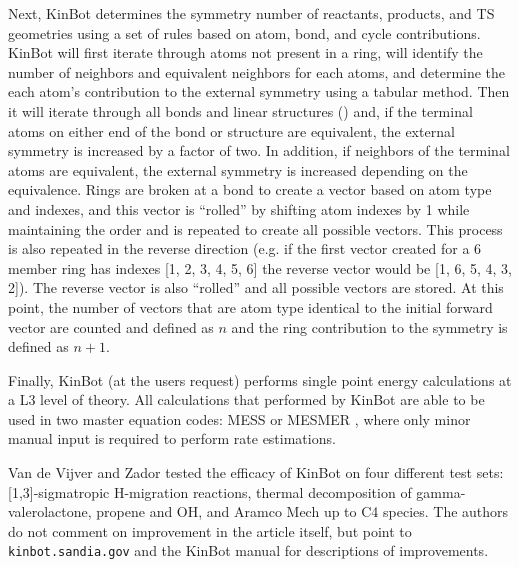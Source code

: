 \documentclass[preprint, 11pt]{elsarticle} %
\begin{document}
Next, KinBot determines the symmetry number of reactants, products, and TS geometries using a set of rules based on atom, bond, and cycle contributions.
KinBot will first iterate through atoms not present in a ring, will identify the number of neighbors and equivalent neighbors for each atoms, and determine the each atom's contribution to the external symmetry using a tabular method.
Then it will iterate through all bonds and linear structures () and, if the terminal atoms on either end of the bond or structure are equivalent, the external symmetry is increased by a factor of two.
In addition, if neighbors of the terminal atoms are equivalent, the external symmetry is increased depending on the equivalence.
Rings are broken at a bond to create a vector based on atom type and indexes, and this vector is ``rolled'' by shifting atom indexes by 1 while maintaining the order and is repeated to create all possible vectors.
This process is also repeated in the reverse direction (e.g. if the first vector created for a 6 member ring has indexes [1, 2, 3, 4, 5, 6] the reverse vector would be [1, 6, 5, 4, 3, 2]).
The reverse vector is also ``rolled'' and all possible vectors are stored.
At this point, the number of vectors that are atom type identical to the initial forward vector are counted and defined as $n$ and the ring contribution to the symmetry is defined as $n+1$. 

Finally, KinBot (at the users request) performs single point energy calculations at a L3 level of theory.
All calculations that performed by KinBot are able to be used in two master equation codes: MESS \cite{MESS:2013} or MESMER \cite{MESMER:2012}, where only minor manual input is required to perform rate estimations.

Van de Vijver and Zador tested the efficacy of KinBot on four different test sets: [1,3]-sigmatropic H-migration reactions, thermal decomposition of gamma-valerolactone, propene and OH, and Aramco Mech up to C4 species.
The authors do not comment on improvement in the article itself, but point to \texttt{kinbot.sandia.gov} and the KinBot manual for descriptions of improvements.
\end{document}
